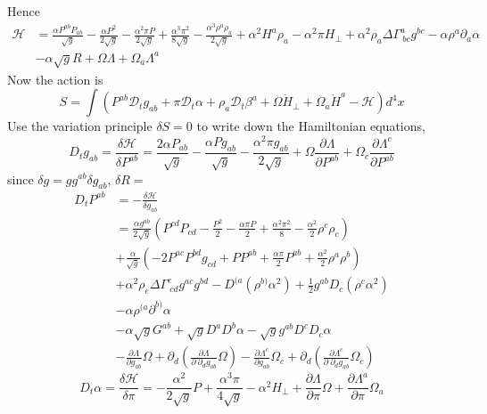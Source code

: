 \documentclass{article}
\begin{document}
Hence
\begin{align*}
\mathscr{H} & = \frac{\alpha P^{ab}P_{ab}}{\sqrt{g}} - \frac{\alpha P^{2}}{2\sqrt{g}} - \frac{\alpha^{2}\pi P}{2\sqrt{g}} + \frac{\alpha^{3}\pi^{2}}{8\sqrt{g}} - \frac{\alpha^{3}\rho^{a}\rho_{a}}{2\sqrt{g}} + \alpha^{2}H^{a}\rho_{a} - \alpha^{2}\pi H_{\perp} + \alpha^{2}\rho_{a}\Delta \Gamma^{a}_{~bc}g^{bc} - \alpha \rho^{a}\partial_{a}\alpha\\
&  - \alpha \sqrt{g}R + \Omega\Lambda + \Omega_{a}\Lambda^{a}
\end{align*}
Now the action is
\[
S = \int \left( P^{ab}\mathscr{D}_{t}g_{ab} + \pi \mathscr{D}_{t}\alpha + \rho_{a}\mathscr{D}_{t}\beta^{a} + \Omega{\dot H}_{\perp} + \Omega_{a}{\dot H}^{a} - \mathscr{H}\right) d^{4} x
\]
Use the variation principle $\delta S = 0$ to write down the Hamiltonian equations,
\[
D_{t}g_{ab} = \frac{\delta \mathscr{H}}{\delta P^{ab}} = \frac{2\alpha P_{ab}}{\sqrt{g}} - \frac{\alpha P g_{ab}}{\sqrt{g}} - \frac{\alpha^{2} \pi g_{ab}}{2 \sqrt{g}} + \Omega\frac{\partial \Lambda}{\partial P^{ab}} + \Omega_{c}\frac{\partial \Lambda^{c}}{\partial P^{ab}}
\]
since $\delta g = g g^{ab}\delta g_{ab}$, $\delta R = $
\begin{align*}
D_{t} P^{ab} & = - \frac{\delta \mathscr{H}}{\delta g_{ab}}\\
&  = \frac{\alpha g^{ab}}{2\sqrt{g}}\left(P^{cd}P_{cd} - \frac{P^{2}}{2} - \frac{\alpha \pi P}{2} + \frac{\alpha^{2}\pi^{2}}{8} - \frac{\alpha^{2}}{2}\rho^{c}\rho_{c}\right)\\
& + \frac{\alpha}{\sqrt{g}}\left(-2P^{ac}P^{bd}g_{cd} + PP^{ab} + \frac{\alpha \pi}{2}P^{ab} + \frac{\alpha^{2}}{2}\rho^{a}\rho^{b}\right)\\
& + \alpha^{2}\rho_{e}\Delta \Gamma^{e}_{~cd}g^{ac}g^{bd} - D^{(a}\left(\rho^{b)}\alpha^{2}\right) + \frac{1}{2}g^{ab}D_{c}\left(\rho^{c}\alpha^{2}\right)\\
& - \alpha \rho^{(a}\partial^{b)}\alpha\\
& - \alpha \sqrt{g}G^{ab} + \sqrt{g}D^{a}D^{b}\alpha - \sqrt{g}g^{ab}D^{c}D_{c}\alpha\\
& - \frac{\partial \Lambda}{\partial g_{ab}}\Omega + \partial_{d}\left(\frac{\partial \Lambda}{\partial~\partial_{d}g_{ab}}\Omega\right) - \frac{\partial \Lambda^{c}}{\partial g_{ab}}\Omega_{c} + \partial_{d}\left(\frac{\partial \Lambda^{c}}{\partial~\partial_{d}g_{ab}}\Omega_{c}\right)
\end{align*}
\[
D_{t}\alpha = \frac{\delta \mathscr{H}}{\delta \pi} = - \frac{\alpha^{2}}{2\sqrt{g}}P + \frac{\alpha^{3}\pi}{4\sqrt{g}} - \alpha^{2}H_{\perp} + \frac{\partial \Lambda}{\partial \pi}\Omega + \frac{\partial \Lambda^{a}}{\partial \pi}\Omega_{a}
\]
\end{document}
